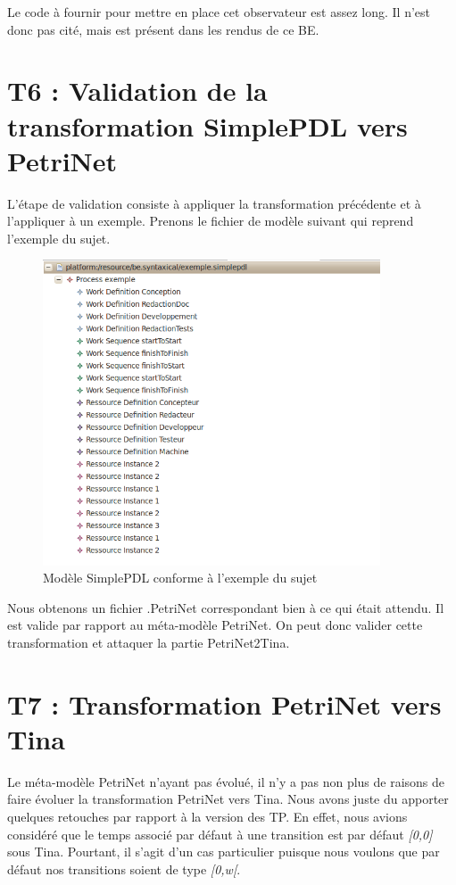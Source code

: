 \documentclass{report}
\begin{document}
\newpage

Le code à fournir pour mettre en place cet observateur est assez long. Il n'est donc pas cité, mais est présent dans les rendus de ce BE.

\section{T6 : Validation de la transformation SimplePDL vers PetriNet}

L'étape de validation consiste à appliquer la transformation précédente et à l'appliquer à un exemple. Prenons le fichier de modèle suivant qui reprend l'exemple du sujet.

\begin{figure}[!h] 
\begin{center}
\includegraphics[width=10cm]{Capture-7.png}
\caption{Modèle SimplePDL conforme à l'exemple du sujet} 
\label{img1} 
\end{center}
\end{figure} 

Nous obtenons un fichier .PetriNet correspondant bien à ce qui était attendu. Il est valide par rapport au méta-modèle PetriNet.
On peut donc valider cette transformation et attaquer la partie PetriNet2Tina.

\section{T7 : Transformation PetriNet vers Tina}

Le méta-modèle PetriNet n'ayant pas évolué, il n'y a pas non plus de raisons de faire évoluer la transformation PetriNet vers Tina. 
Nous avons juste du apporter quelques retouches par rapport à la version des TP. En effet, nous avions considéré que le temps associé par défaut à une transition est par défaut \textit{[0,0]} sous Tina. Pourtant, il s'agit d'un cas particulier puisque nous voulons que par défaut nos transitions soient de type \textit{[0,w[}.\\
\end{document}
